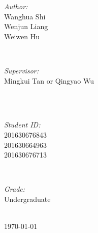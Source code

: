 \documentclass[journal, a4paper]{IEEEtran}
\begin{document}
\begin{titlepage}
\begin{minipage}{0.4\textwidth}
\begin{flushleft} \large
\emph{Author:}\\
Wanghua Shi   \\ %
Wenjun Liang   \\
Weiwen Hu 
\end{flushleft}
\end{minipage}
~
\begin{minipage}{0.4\textwidth}
\begin{flushright} \large
\emph{Supervisor:} \\
Mingkui Tan or Qingyao Wu %
\end{flushright}
\end{minipage}\\[2cm]
~
\begin{minipage}{0.4\textwidth}
\begin{flushleft} \large
\emph{Student ID:}\\
201630676843 \\
201630664963  \\
201630676713


\end{flushleft}
\end{minipage}
~
\begin{minipage}{0.4\textwidth}
\begin{flushright} \large
\emph{Grade:} \\
Undergraduate 
\end{flushright}
\end{minipage}\\[2cm]



{\large \today}\\[2cm] %

 

\vfill %

\end{titlepage}
\end{document}
